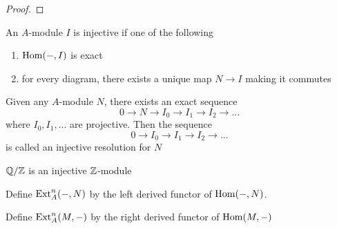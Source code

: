 \begin{proof}
\end{proof}

\begin{definition}
	An $A$-module $I$ is injective if one of the following
	\begin{enumerate}
		\item $\operatorname{Hom}(-, I)$ is exact
		\item for every diagram, there exists a unique map $N \to I$ making it commutes
		\begin{center}
		\end{center}
	\end{enumerate}
	
	Given any $A$-module $N$, there exists an exact sequence
	$$
		0 \to N \to I_0 \to I_1 \to I_2 \to  ...
	$$
	where $I_0, I_1, ...$ are projective. Then the sequence
	$$
		0 \to I_0 \to I_1 \to I_2 \to  ...
	$$	
	is called an injective resolution for $N$
\end{definition}

\begin{remark}
	$\mathbb{Q} / \mathbb{Z}$ is an injective $\mathbb{Z}$-module
\end{remark}

\begin{definition}[Ext]
	Define $\operatorname{Ext}_A^n(-, N)$ by the left derived functor of $\operatorname{Hom}(-, N)$.
	
	Define $\operatorname{Ext}_A^n(M, -)$ by the right derived functor of $\operatorname{Hom}(M, -)$
\end{definition}

